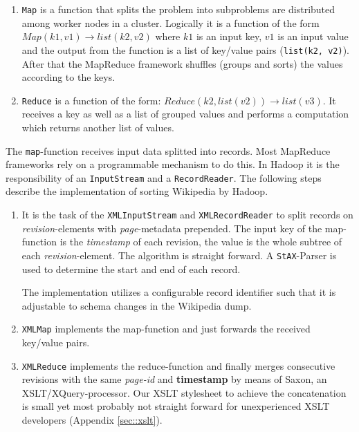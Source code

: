 \begin{enumerate}
\item \texttt{Map} is a function that splits the problem into subproblems are distributed among worker nodes in a cluster. Logically it is a function of the form \texttt{$Map(k1,v1) \rightarrow list(k2,v2)$} where $k1$ is an input key, $v1$ is an input value and the output from the function is a list of key/value pairs (\texttt{list(k2, v2)}). After that the MapReduce framework shuffles (groups and sorts) the values according to the keys.
\item \texttt{Reduce} is a function of the form: \texttt{$Reduce(k2, list (v2)) \rightarrow list(v3)$}. It receives a key as well as a list of grouped values and performs a computation which returns another list of values.
\end{enumerate}

The \texttt{map}-function receives input data splitted into records. Most MapReduce frameworks rely on a programmable mechanism to do this. In Hadoop it is the responsibility of an \texttt{InputStream} and a \texttt{RecordReader}. The following steps describe the implementation of sorting Wikipedia by Hadoop.

\begin{enumerate}
\item It is the task of the \texttt{XMLInputStream} and \texttt{XMLRecordReader} to split records on \emph{revision}-elements with \emph{page}-metadata prepended. The input key of the map-function is the \emph{timestamp} of each revision, the value is the whole subtree of each \emph{revision}-element. The algorithm is straight forward. A \texttt{StAX}-Parser is used to determine the start and end of each record.

The implementation utilizes a configurable record identifier such that it is adjustable to schema changes in the Wikipedia dump. 

\item \texttt{XMLMap} implements the map-function and just forwards the received key/value pairs.
\item \texttt{XMLReduce} implements the reduce-function and finally merges consecutive revisions with the same \emph{page-id} and \textbf{timestamp} by means of Saxon, an XSLT/XQuery-processor. Our XSLT stylesheet to achieve the concatenation is small yet most probably not straight forward for unexperienced XSLT developers (Appendix \ref{sec::xslt}).
\end{enumerate}

